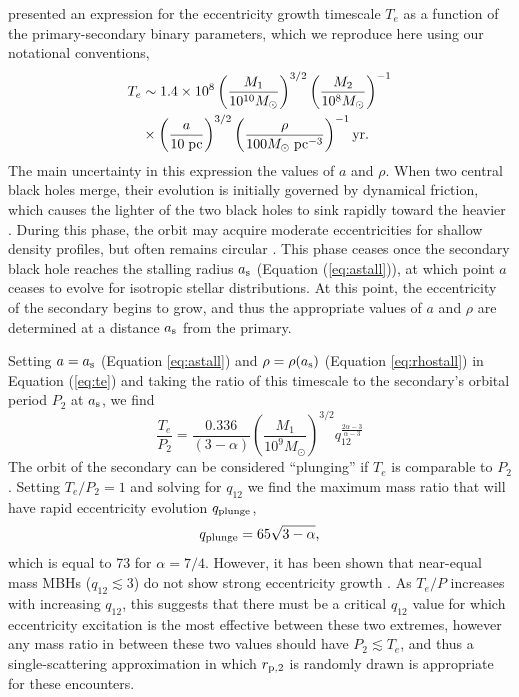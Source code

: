 \documentclass[a4paper,twocolumn]{emulateapj}
\begin{document}
{\citet{Iwasawa:2011a} presented an expression for the eccentricity growth timescale $T_{e}$ as a function of the primary-secondary binary parameters, which we reproduce here using our notational conventions,
\begin{align}
T_{e} &\sim 1.4 \times 10^{8} \left(\frac{M_{1}}{10^{10} M_{\odot}}\right)^{3/2}\left(\frac{M_{2}}{10^{8} M_{\odot}}\right)^{-1}\nonumber\\
&\times \left(\frac{a}{10\;{\rm pc}}\right)^{3/2}\left(\frac{\rho}{100 M_{\odot}\;{\rm pc}^{-3}}\right)^{-1} {\rm yr}.
\label{eq:te}
\end{align}
The main uncertainty in this expression the values of $a$ and $\rho$. When two central black holes merge, their evolution is initially governed by dynamical friction, which causes the lighter of the two black holes to sink rapidly toward the heavier \citep{Dotti:2012a}. During this phase, the orbit may acquire moderate eccentricities for shallow density profiles, but often remains circular \citep{Antonini:2012a}. This phase ceases once the secondary black hole reaches the stalling radius $a_{\rm s}$ (Equation (\ref{eq:astall})), at which point $a$ ceases to evolve for isotropic stellar distributions. At this point, the eccentricity of the secondary begins to grow, and thus the appropriate values of $a$ and $\rho$ are determined at a distance $a_{\rm s}$ from the primary.

Setting $a = a_{\rm s}$ (Equation \ref{eq:astall}) and $\rho = \rho(a_{\rm s})$ (Equation \ref{eq:rhostall}) in Equation (\ref{eq:te}) and taking the ratio of this timescale to the secondary's orbital period $P_{2}$ at $a_{\rm s}$, we find
\begin{equation}
\frac{T_{e}}{P_{2}}=\frac{0.336}{(3-\alpha)}\left(\frac{M_1}{10^{9} M_{\odot}}\right)^{3/2}q_{12}^{\frac{2\alpha-3}{\alpha-3}}
\end{equation}
The orbit of the secondary can be considered ``plunging'' if $T_{e}$ is comparable to $P_{2}$. Setting $T_{e}/P_{2} = 1$ and solving for $q_{12}$ we find the maximum mass ratio that will have rapid eccentricity evolution $q_{\rm plunge}$,
\begin{equation}
q_{\rm plunge} = 65 \sqrt{3-\alpha}\label{eq:qplunge},
\end{equation}
which is equal to 73 for $\alpha = 7/4$. However, it has been shown that near-equal mass MBHs ($q_{12} \lesssim 3$) do not show strong eccentricity growth \citep{Sesana:2010a,Wang:2014b}. As $T_{e}/P$ increases with increasing $q_{12}$, this suggests that there must be a critical $q_{12}$ value for which eccentricity excitation is the most effective between these two extremes, however any mass ratio in between these two values should have $P_{2} \lesssim T_{e}$, and thus a single-scattering approximation in which $r_{\rm p,2}$ is randomly drawn is appropriate for these encounters.

}
\end{document}
